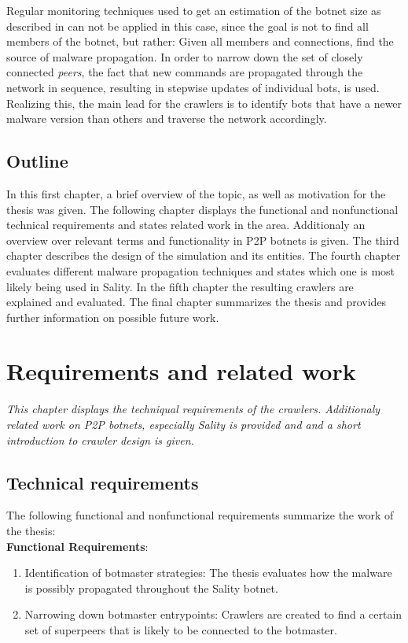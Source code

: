 \documentclass{article}
\begin{document}
Regular monitoring techniques used to get an estimation of the botnet size as described in \cite{AMP2P} can not be applied in this case, since the goal is not to find all members of the botnet, but rather: Given all members and connections, find the source of malware propagation. In order to narrow down the set of closely connected \emph{peers}, the fact that new commands are propagated through the network in sequence, resulting in stepwise updates of individual bots, is used. Realizing this, the main lead for the crawlers is to identify bots that have a newer malware version than others and traverse the network accordingly. \\

\subsection{Outline}
In this first chapter, a brief overview of the topic, as well as motivation for the thesis was given. The following chapter displays the functional and nonfunctional technical requirements and states related work in the area. Additionaly an overview over relevant terms and functionality in P2P botnets is given. The third chapter describes the design of the simulation and its entities. The fourth chapter evaluates different malware propagation techniques and states which one is most likely being used in Sality. In the fifth chapter the resulting crawlers are explained and evaluated. The final chapter summarizes the thesis and provides further information on possible future work.

\section{Requirements and related work}
\emph{This chapter displays the techniqual requirements of the crawlers. Additionaly related work on P2P botnets, especially Sality is provided and and a short introduction to crawler design is given.}

\subsection{Technical requirements}
The following functional and nonfunctional requirements summarize the work of the thesis: \\

\textbf{Functional Requirements}:
\begin{enumerate}
    \item Identification of botmaster strategies: The thesis evaluates how the malware is possibly propagated throughout the Sality botnet.
    \item Narrowing down botmaster entrypoints: Crawlers are created to find a certain set of superpeers that is likely to be connected to the botmaster.
\end{enumerate}
\end{document}
